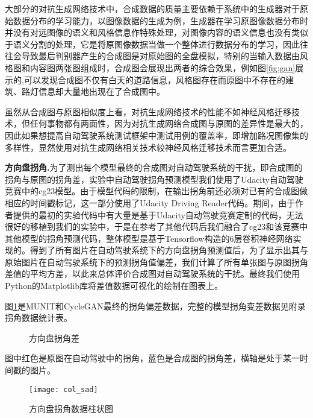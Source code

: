 大部分的对抗生成网络技术中，合成数据的质量主要依赖于系统中的生成器对于原始数据分布的学习能力，以图像数据的生成为例，生成器在学习原图像数据分布时并没有对远图像的语义和风格信息作特殊处理，对图像内容的语义信息也没有类似于语义分割的处理，它是将原图像数据当做一个整体进行数据分布的学习，因此往往会导致最后判别器产生的合成图是对原始图的全盘模拟，特别的当输入数据由风格图和内容图两张图组成时，合成图会展现出两者的综合效果，例如图\ref{fig:gan}展示的,可以发现合成图不仅有白天的道路信息，风格图存在而原图中不存在的建筑、路灯信息却大量地出现在了合成图中。

虽然从合成图与原图相似度上看，对抗生成网络技术的性能不如神经风格迁移技术，但任何事物都有两面性，因为对抗生成网络合成图与原图的差异性是最大的，因此如果想提高自动驾驶系统测试框架中测试用例的覆盖率，即增加路况图像集的多样性，显然使用对抗生成网络相关技术较神经风格迁移技术而言更加合适。

\textbf{方向盘拐角.}\quad 为了测出每个模型最终的合成图对自动驾驶系统的干扰，即合成图的拐角与原图的拐角差，实验中自动驾驶拐角预测模型我们使用了Udacity自动驾驶竞赛中的cg23\cite{cg23}模型。由于模型代码的限制，在输出拐角前还必须对已有的合成图做相应的时间戳标记，这一部分使用了Udacity Driving Reader代码\cite{git:udr}。期间，由于作者提供的最初的实验代码中有大量是基于Udacity自动驾驶竞赛定制的代码，无法很好的移植到我们的实验中，于是在参考了其他代码后我们融合了cg23和该竞赛中其他模型的拐角预测代码，整体模型是基于Tensorflow构造的6层卷积神经网络实现的。得到了所有图片在自动驾驶系统下的方向盘拐角预测值后，为了显示出其与原始图片在自动驾驶系统下的预测拐角值偏差，我们计算了所有单张图与原图拐角差值的平均方差，以此来总体评价合成图对自动驾驶系统的干扰。最终我们使用Python的Matplotlib库将差值数据可视化的绘制在图表上。

图\ref{fig:sad}是MUNIT和CycleGAN最终的拐角偏差数据，完整的模型拐角变差数据见附录拐角数据统计表。
\begin{figure}[!h]
    \caption{方向盘拐角差}
    \label{fig:sad}
\end{figure}

图中红色是原图在自动驾驶中的拐角，蓝色是合成图的拐角差，横轴是处于某一时间戳的图片。

\begin{figure}[ht]
    \centering
    \texttt{[image: col\_sad]}
    \caption{方向盘拐角数据柱状图}
    \label{fig:col_sad}
\end{figure}

